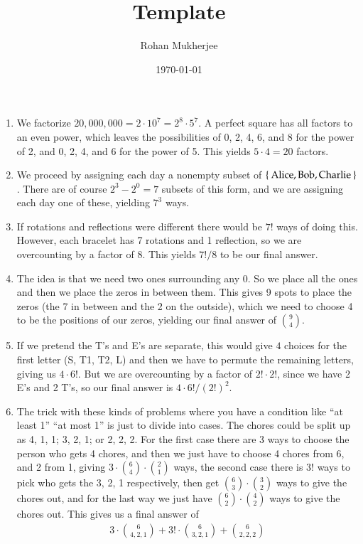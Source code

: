 \documentclass[12pt]{article}
\title{Template}
\date{\today}
\author{Rohan Mukherjee}
\theoremstyle{definitionstyle}
\begin{document}
	\maketitle
	\begin{enumerate}[leftmargin=\labelsep]
		\item We factorize $20,000,000 = 2 \cdot 10^7 = 2^8 \cdot 5^7$. A perfect square has all factors to an even power, which leaves the possibilities of 0, 2, 4, 6, and 8 for the power of 2, and 0, 2, 4, and 6 for the power of 5. This yields $5 \cdot 4 = 20$ factors.
		
		\item We proceed by assigning each day a nonempty subset of $\Set{\mathrm{Alice}, \mathrm{Bob}, \mathrm{Charlie}}$. There are of course $2^3 - 2^0 = 7$ subsets of this form, and we are assigning each day one of these, yielding $7^3$ ways.
		
		\item If rotations and reflections were different there would be $7!$ ways of doing this. However, each bracelet has 7 rotations and 1 reflection, so we are overcounting by a factor of 8. This yields $7!/8$ to be our final answer.
		
		\item The idea is that we need two ones surrounding any 0. So we place all the ones and then we place the zeros in between them. This gives 9 spots to place the zeros (the 7 in between and the 2 on the outside), which we need to choose 4 to be the positions of our zeros, yielding our final answer of ${9 \choose 4}$.
		
		\item If we pretend the T's and E's are separate, this would give $4$ choices for the first letter (S, T1, T2, L) and then we have to permute the remaining letters, giving us $4 \cdot 6!$. But we are overcounting by a factor of $2! \cdot 2!$, since we have 2 E's and 2 T's, so our final answer is $4 \cdot 6! / (2!)^2$.
		
		\item The trick with these kinds of problems where you have a condition like ``at least 1'' ``at most 1'' is just to divide into cases. The chores could be split up as 4, 1, 1; 3, 2, 1; or 2, 2, 2. For the first case there are 3 ways to choose the person who gets 4 chores, and then we just have to choose 4 chores from 6, and 2 from 1, giving $3 \cdot {6 \choose 4} \cdot {2 \choose 1}$ ways, the second case there is $3!$ ways to pick who gets the 3, 2, 1 respectively, then get ${6 \choose 3} \cdot {3 \choose 2}$ ways to give the chores out, and for the last way we just have ${6 \choose 2} \cdot {4 \choose 2}$ ways to give the chores out. This gives us a final answer of
		\begin{align*}
			3 \cdot {6 \choose 4, 2, 1} + 3! \cdot {6 \choose 3, 2, 1} + {6 \choose 2, 2, 2}
		\end{align*}
	

\end{enumerate}
\end{document}
